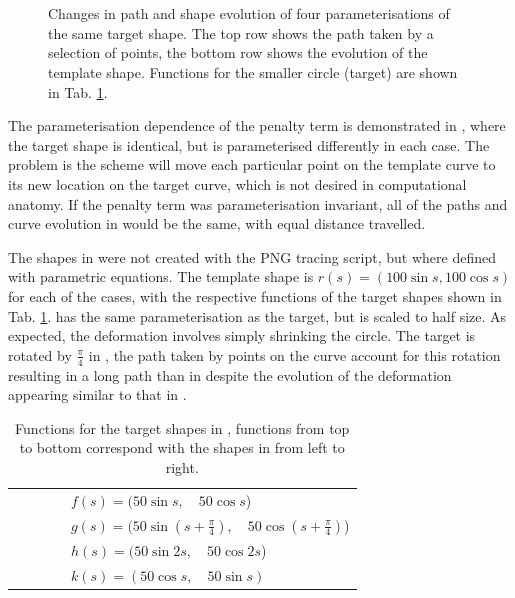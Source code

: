 \documentclass[a4paper, 12pt]{article}
\begin{document}
\begin{figure}[!h]
  \centering
  \\
  \\
  \caption{Changes in path and shape evolution of four parameterisations of the
    same target shape. The top row shows the path taken by a selection of points,
    the bottom row shows the evolution of the template shape. Functions for the smaller circle (target) are shown in Tab. \ref{tab:funs}.}
  \label{fig:reparams}
\end{figure}
The parameterisation dependence of the penalty term is demonstrated in
, where the target shape is identical, but is parameterised
differently in each case. The problem is the scheme will move each particular
point on the template curve to its new location on the target curve, which is
not desired in computational anatomy.  If the penalty term was parameterisation
invariant, all of the paths and curve evolution in  would be the
same, with equal distance travelled.

The shapes in  were not created with the PNG tracing script, but
where defined with parametric equations. The template shape is $r(s) = (100\sin
s, 100\cos s)$ for each of the cases, with the respective functions of the
target shapes shown in Tab. \ref{tab:funs}.  has the same
parameterisation as the target, but is scaled to half size. As expected, the
deformation involves simply shrinking the circle. The target is rotated by
$\frac{\pi}{4}$ in , the path taken by points on the curve account for this
rotation resulting in a long path than in  despite the  evolution
of the deformation appearing similar to that in .

\begin{table}[!h]
\begin{tabular}[h]{l}
    $\quad\quad\quad\quad f(s) =  (50 \sin s,\quad 50 \cos s$) \\
    $\quad\quad\quad\quad g(s) =  (50 \sin (s + \frac{\pi}{4}),\quad 50\cos (s + \frac{\pi}{4})$)\\
    $\quad\quad\quad\quad h(s) =  (50 \sin 2s,\quad 50 \cos 2s$) \\
    $\quad\quad\quad\quad k(s) =  (50 \cos s,\quad 50 \sin s)$
 \end{tabular}
 \caption{Functions for the target shapes in , functions from top
   to bottom correspond with the shapes in  from left to right.}
 \label{tab:funs}
\end{table}
\end{document}
